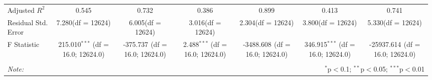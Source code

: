 \begin{table}[!htbp]
\begin{tabular}{@{\extracolsep{5pt}}lcccccc}
 Adjusted $R^2$ & 0.545 & 0.732 & 0.386 & 0.899 & 0.413 & 0.741 \\
 Residual Std. Error & 7.280(df = 12624) & 6.005(df = 12624) & 3.016(df = 12624) & 2.304(df = 12624) & 3.800(df = 12624) & 5.330(df = 12624)  \\
 F Statistic & 215.010$^{***}$ (df = 16.0; 12624.0) & -375.737$^{}$ (df = 16.0; 12624.0) & 2.488$^{***}$ (df = 16.0; 12624.0) & -3488.608$^{}$ (df = 16.0; 12624.0) & 346.915$^{***}$ (df = 16.0; 12624.0) & -25937.614$^{}$ (df = 16.0; 12624.0) \\
\hline
\hline \\[-1.8ex]
\textit{Note:} & \multicolumn{6}{r}{$^{*}$p$<$0.1; $^{**}$p$<$0.05; $^{***}$p$<$0.01} \\
\end{tabular}
\end{table}